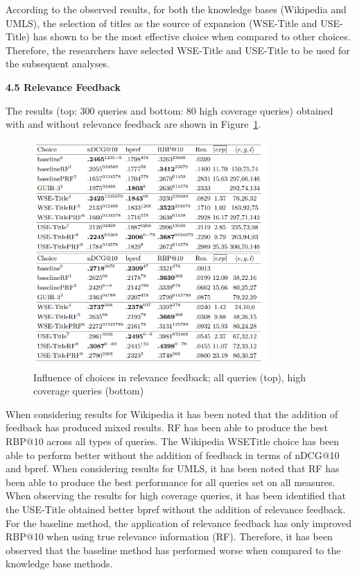 \documentclass[]{article}
\begin{document}
According to the observed results, for both the knowledge bases (Wikipedia and UMLS), the selection of titles as the source of expansion (WSE-Title and USE-Title) has shown to be the most effective choice when compared to other choices. Therefore, the researchers have selected WSE-Title and USE-Title to be used for the subsequent analyses.    

\textbf{4.5 Relevance Feedback} 

The results (top: 300 queries and bottom: 80 high coverage queries) obtained with and without relevance feedback are shown in Figure~\ref{fig32}. 

\begin{figure}[t!]
	\includegraphics[width=0.8\textwidth]{Capture32.png}
	\caption{Influence of choices in relevance feedback; all queries (top), high coverage queries (bottom) \label{fig32}}
\end{figure} 

When considering results for Wikipedia it has been noted that the addition of feedback has produced mixed results. RF has been able to produce the best RBP@10 across all types of queries. The Wikipedia WSETitle choice has been able to perform better without the addition of feedback in terms of nDCG@10 and bpref. When considering results for UMLS, it has been noted that RF has been able to produce the best performance for all queries set on all measures. When observing the results for high coverage queries, it has been identified that the USE-Title obtained better bpref without the addition of relevance feedback. For the baseline method, the application of relevance feedback has only improved RBP@10 when using true relevance information (RF). Therefore, it has been observed that the baseline method has performed worse when compared to the knowledge base methods.               
\end{document}
